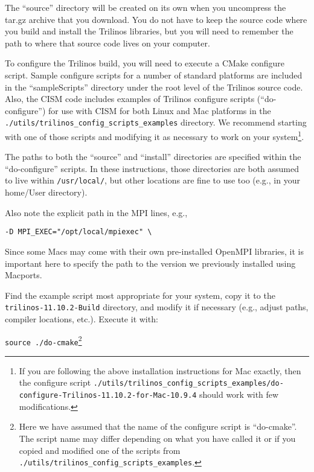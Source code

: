 The ``source'' directory will be created on its own when you uncompress the tar.gz archive 
that you download. You do not have to keep the source code where you build and install 
the Trilinos libraries, but you will need to remember the path to where that source code 
lives on your computer. 

To configure the Trilinos build, you will need to execute a CMake configure script. 
Sample configure scripts for a number of standard platforms are included in the ``sampleScripts''
directory under the root level of the Trilinos source code. 
Also, the CISM code includes examples of Trilinos configure scripts (``do-configure'') 
for use with CISM for both Linux and Mac platforms in the 
\texttt{./utils/trilinos\_config\_scripts\_examples} directory. 
We recommend starting with one of those scripts and modifying it as
necessary to work on your system\footnote{If you are following the above installation instructions for
Mac exactly, then the configure script 
\texttt{./utils/trilinos\_config\_scripts\_examples/do-configure-Trilinos-11.10.2-for-Mac-10.9.4} should 
work with few modifications.}.

The paths to both the ``source'' and ``install'' directories are specified within the ``do-configure'' scripts. In these instructions, those directories are both assumed to live within \texttt{/usr/local/},
but other locations are fine to use too (e.g., in your home/User directory).

\begin{mdframed}[style=mac] %
Also note the explicit path in the MPI lines, e.g.,

\begin{verbatim}
-D MPI_EXEC="/opt/local/mpiexec" \
\end{verbatim}

Since some Macs may come with their own pre-installed OpenMPI libraries, it is important here to specify the path to the version we previously installed using Macports.
\end{mdframed}              %

Find the example script most appropriate for your system, copy it to the \texttt{trilinos-11.10.2-Build} directory, and modify it if necessary (e.g., adjust paths, compiler locations, etc.).
Execute it with: 

\texttt{source ./do-cmake}\footnote{Here we have assumed that the name of the configure script is ``do-cmake''. The script name may differ depending on what you have called it or if you copied and modified one of the scripts from \texttt{./utils/trilinos\_config\_scripts\_examples}.}

